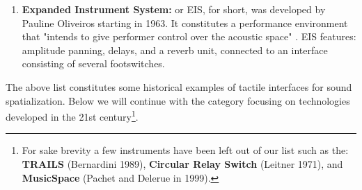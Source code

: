 \begin{enumerate}
    
    \item \textbf{Expanded Instrument System:} or EIS, for short, was developed by Pauline Oliveiros starting in 1963. It constitutes a performance environment that "intends to give performer control over the acoustic space" \cite{pysiewicz2017instruments}. EIS features: amplitude panning, delays, and a reverb unit, connected to an interface consisting of several footswitches.
    
\end{enumerate}

The above list constitutes some historical examples of tactile interfaces for sound spatialization. Below we will continue with the category focusing on technologies developed in the 21st century\footnote{For sake brevity a few instruments have been left out of our list such as the: \textbf{TRAILS} (Bernardini 1989), \textbf{Circular Relay Switch} (Leitner 1971), and \textbf{MusicSpace} (Pachet and Delerue in 1999).}.

